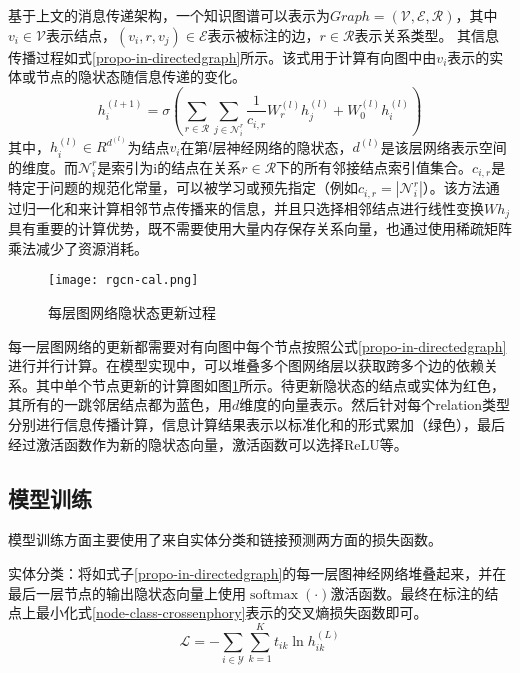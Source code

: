 基于上文的消息传递架构，一个知识图谱可以表示为$Graph=\left(\mathcal{V},\mathcal{E},\mathcal{R}\right)$，其中$v_i\in\mathcal{V}$表示结点，$\left(v_i,r,v_j\right)\in\mathcal{E}$表示被标注的边，$r\in\mathcal{R}$表示关系类型。
其信息传播过程如式\ref{propo-in-directedgraph}所示。该式用于计算有向图中由$v_{i}$表示的实体或节点的隐状态随信息传递的变化。
\begin{equation}
    h_{i}^{(l+1)}=\sigma\left(\sum_{r \in \mathcal{R}} \sum_{j \in \mathcal{N}_{i}^{r}} \frac{1}{c_{i, r}} W_{r}^{(l)} h_{j}^{(l)}+W_{0}^{(l)} h_{i}^{(l)}\right)
    \label{propo-in-directedgraph}
\end{equation}
其中，$h_i^{\left(l\right)}\in R^{d^{\left(l\right)}}$为结点$v_i$在第$l$层神经网络的隐状态，$d^{\left(l\right)}$是该层网络表示空间的维度。而$\mathcal{N}_{i}^{r}$是索引为i的结点在关系$r\in\mathcal{R}$下的所有邻接结点索引值集合。$c_{i,r}$是特定于问题的规范化常量，可以被学习或预先指定（例如$c_{i, r}=\left|\mathcal{N}_{i}^{r}\right|$）。该方法通过归一化和来计算相邻节点传播来的信息，并且只选择相邻结点进行线性变换$Wh_j$具有重要的计算优势，既不需要使用大量内存保存关系向量，也通过使用稀疏矩阵乘法减少了资源消耗。

\begin{figure}[htbp]
    \centering
    \texttt{[image: rgcn-cal.png]}
    \caption{每层图网络隐状态更新过程\label{rgcn-cal}}
\end{figure}

每一层图网络的更新都需要对有向图中每个节点按照公式\ref{propo-in-directedgraph}进行并行计算。在模型实现中，可以堆叠多个图网络层以获取跨多个边的依赖关系。其中单个节点更新的计算图如图\ref{rgcn-cal}所示。待更新隐状态的结点或实体为红色，其所有的一跳邻居结点都为蓝色，用$d$维度的向量表示。然后针对每个relation类型分别进行信息传播计算，信息计算结果表示以标准化和的形式累加（绿色），最后经过激活函数作为新的隐状态向量，激活函数可以选择ReLU等。

\subsection{模型训练}
模型训练方面主要使用了来自实体分类和链接预测两方面的损失函数。

实体分类：将如式子\ref{propo-in-directedgraph}的每一层图神经网络堆叠起来，并在最后一层节点的输出隐状态向量上使用$\operatorname{softmax}(\cdot)$激活函数。最终在标注的结点上最小化式\ref{node-class-crossenphory}表示的交叉熵损失函数即可。
\begin{equation}
    \mathcal{L}=-\sum_{i \in \mathcal{Y}} \sum_{k=1}^{K} t_{i k} \ln h_{i k}^{(L)}
    \label{node-class-crossenphory}
\end{equation}

